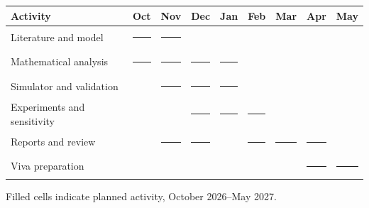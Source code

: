 \documentclass[10pt,a4paper,oneside]{article}
\begin{document}
\begin{center}
\begingroup
\small
\setlength{\tabcolsep}{3pt}
\renewcommand{\arraystretch}{1.25}
\newcommand{\planned}{\rule{0.8em}{0.55em}}
\begin{tabularx}{\linewidth}{@{}>{\raggedright\arraybackslash}X*{8}{c}@{}}
\toprule
Activity & Oct & Nov & Dec & Jan & Feb & Mar & Apr & May \\
\midrule
Literature and model & \planned & \planned & & & & & & \\
Mathematical analysis & \planned & \planned & \planned & \planned & & & & \\
Simulator and validation & & \planned & \planned & \planned & & & & \\
Experiments and sensitivity & & & \planned & \planned & \planned & & & \\
Reports and review & & \planned & \planned & & \planned & \planned & \planned & \\
Viva preparation & & & & & & & \planned & \planned \\
\bottomrule
\end{tabularx}
\par\smallskip
{\footnotesize Filled cells indicate planned activity, October 2026--May 2027.}
\endgroup
\end{center}
\end{document}
